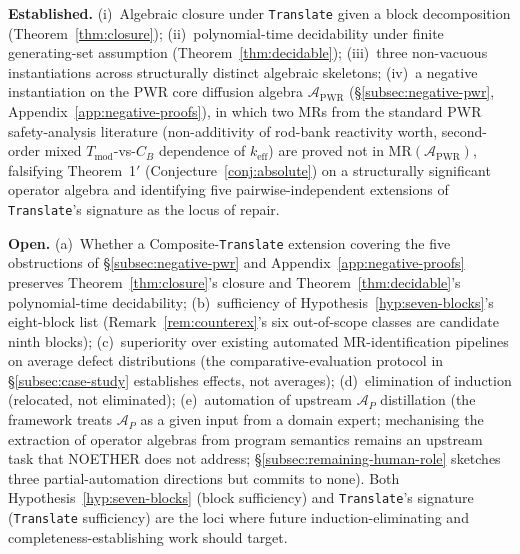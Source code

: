\documentclass[acmsmall, screen]{acmart}
\begin{document}
\begin{tcolorbox}[colback=gray!5,colframe=black!50,arc=2pt,boxrule=0.5pt,fontupper=\small,title=Boundary of contribution (Conclusion restatement),fonttitle=\small\bfseries]
\textbf{Established.} (i)~Algebraic closure under \texttt{Translate} given a block decomposition (Theorem~\ref{thm:closure}); (ii)~polynomial-time decidability under finite generating-set assumption (Theorem~\ref{thm:decidable}); (iii)~three non-vacuous instantiations across structurally distinct algebraic skeletons; (iv)~a negative instantiation on the PWR core diffusion algebra $\mathcal{A}_{\mathrm{PWR}}$ (\S\ref{subsec:negative-pwr}, Appendix~\ref{app:negative-proofs}), in which two MRs from the standard PWR safety-analysis literature (non-additivity of rod-bank reactivity worth, second-order mixed $T_{\mathrm{mod}}$-vs-$C_B$ dependence of $k_{\mathrm{eff}}$) are proved not in $\mathrm{MR}(\mathcal{A}_{\mathrm{PWR}})$, falsifying Theorem~1$'$ (Conjecture~\ref{conj:absolute}) on a structurally significant operator algebra and identifying five pairwise-independent extensions of \texttt{Translate}'s signature as the locus of repair.

\textbf{Open.} (a)~Whether a Composite-\texttt{Translate} extension covering the five obstructions of \S\ref{subsec:negative-pwr} and Appendix~\ref{app:negative-proofs} preserves Theorem~\ref{thm:closure}'s closure and Theorem~\ref{thm:decidable}'s polynomial-time decidability; (b)~sufficiency of Hypothesis~\ref{hyp:seven-blocks}'s eight-block list (Remark~\ref{rem:counterex}'s six out-of-scope classes are candidate ninth blocks); (c)~superiority over existing automated MR-identification pipelines on average defect distributions (the comparative-evaluation protocol in \S\ref{subsec:case-study} establishes effects, not averages); (d)~elimination of induction (relocated, not eliminated); (e)~automation of upstream $\mathcal{A}_P$ distillation (the framework treats $\mathcal{A}_P$ as a given input from a domain expert; mechanising the extraction of operator algebras from program semantics remains an upstream task that NOETHER does not address; \S\ref{subsec:remaining-human-role} sketches three partial-automation directions but commits to none). Both Hypothesis~\ref{hyp:seven-blocks} (block sufficiency) and \texttt{Translate}'s signature (\texttt{Translate} sufficiency) are the loci where future induction-eliminating and completeness-establishing work should target.
\end{tcolorbox}

\appendix
\end{document}
